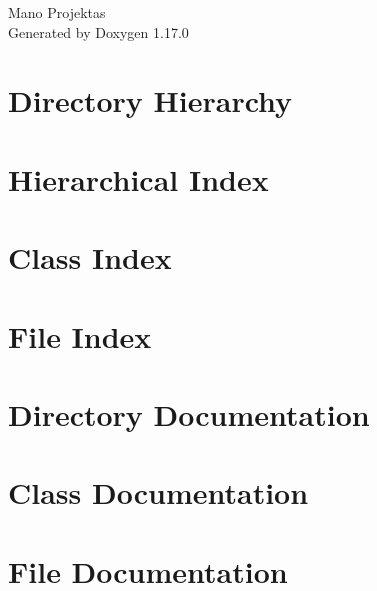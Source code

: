 \documentclass[twoside]{book}
\newcommand{\+}{\discretionary{\mbox{\scriptsize$\hookleftarrow$}}{}{}}
\newcommand{\clearemptydoublepage}{%
    \newpage{\pagestyle{empty}\cleardoublepage}%
  }
\begin{document}
  \raggedbottom
    \hypersetup{pageanchor=false,
                bookmarksnumbered=true,
                pdfencoding=unicode
               }
  \begin{titlepage}
  \vspace*{7cm}
  \begin{center}%
  {\Large Mano Projektas}\\
  \vspace*{1cm}
  {\large Generated by Doxygen 1.17.0}\\
  \end{center}
  \end{titlepage}
  \clearemptydoublepage
  \tableofcontents
  \clearemptydoublepage
  \hypersetup{pageanchor=true}
\chapter{Directory Hierarchy}

\chapter{Hierarchical Index}

\chapter{Class Index}

\chapter{File Index}

\chapter{Directory Documentation}

\chapter{Class Documentation}



\chapter{File Documentation}













  \backmatter
  \newpage
  \clearemptydoublepage
  \printindex
\end{document}

